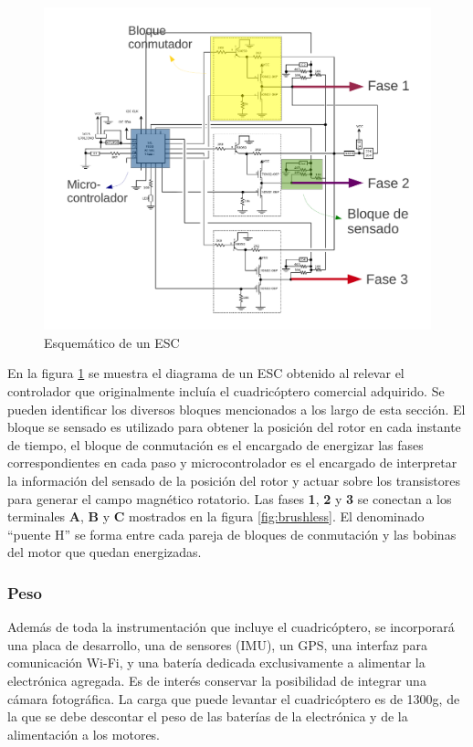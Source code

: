 \documentclass[main]{subfiles}
\begin{document}
\begin{figure}[h!]
	\centering
	\includegraphics[width=1\textwidth]{./pics_eleccion_hardware/diagrama_ESC.pdf}
	\vspace{-10pt}
	\caption{Esquemático de un ESC}
	\label{fig:diagrama_esc}
\end{figure}

En la figura \ref{fig:diagrama_esc} se muestra el diagrama de un ESC obtenido al relevar el controlador que originalmente incluía el cuadricóptero comercial adquirido. Se pueden identificar los diversos bloques mencionados a los largo de esta sección. El bloque se sensado es utilizado para obtener la posición del rotor en cada instante de tiempo, el bloque de conmutación es el encargado de energizar las fases correspondientes en cada paso y microcontrolador es el encargado de interpretar la información del sensado de la posición del rotor y actuar sobre los transistores para generar el campo magnético rotatorio. Las fases \textbf{1}, \textbf{2} y \textbf{3} se conectan a los terminales \textbf{A}, \textbf{B} y \textbf{C} mostrados en la figura \ref{fig:brushless}. El denominado ``puente H'' se forma entre cada pareja de bloques de conmutación y las bobinas del motor que quedan energizadas.




\subsubsection*{Peso}

Adem\'as de toda la instrumentaci\'on que incluye el cuadric\'optero, se incorporar\'a una placa de desarrollo, una de sensores (IMU), un GPS, una interfaz para comunicaci\'on Wi-Fi, y una bater\'ia dedicada exclusivamente a alimentar la electr\'onica agregada. Es de inter\'es conservar la posibilidad de integrar una c\'amara fotogr\'afica. La carga que puede levantar el cuadric\'optero es de 1300g, de la que se debe descontar el peso de las bater\'ias de la electr\'onica y de la alimentaci\'on a los motores.
\end{document}
